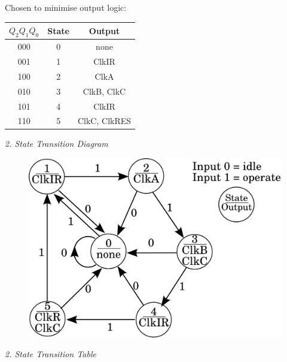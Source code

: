 \documentclass[twocolumn,english]{article}
\providecommand{\tabularnewline}{\\}
\begin{document}
\noindent 
\begin{table}[H]
\noindent \begin{centering}
{\footnotesize{}Chosen to minimise output logic:}
\par\end{centering}{\footnotesize \par}

\smallskip{}


\noindent \centering{}%
\begin{tabular}{ccc}
\toprule 
{\footnotesize{}$Q_{2}Q_{1}Q_{0}$} & {\footnotesize{}State} & {\footnotesize{}Output}\tabularnewline
\midrule 
{\footnotesize{}000} & {\footnotesize{}0} & {\footnotesize{}none}\tabularnewline
{\footnotesize{}001} & {\footnotesize{}1} & {\footnotesize{}ClkIR}\tabularnewline
{\footnotesize{}100} & {\footnotesize{}2} & {\footnotesize{}ClkA}\tabularnewline
{\footnotesize{}010} & {\footnotesize{}3} & {\footnotesize{}ClkB, ClkC}\tabularnewline
{\footnotesize{}101} & {\footnotesize{}4} & {\footnotesize{}ClkIR}\tabularnewline
{\footnotesize{}110} & {\footnotesize{}5} & {\footnotesize{}ClkC, ClkRES}\tabularnewline
\bottomrule
\end{tabular}
\end{table}


\emph{2. State Transition Diagram}

\begin{figure}[H]
\noindent \centering{}\includegraphics[width=0.15\paperwidth]{img/excycle}
\end{figure}


\emph{2. State Transition Table}
\end{document}
